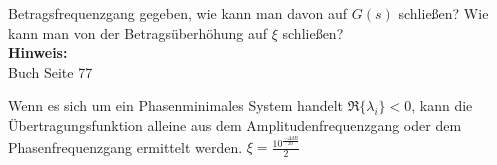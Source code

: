 \begin{question}[section=2,name={Betragsfrequenzgang},difficulty=4,type=mdl,tags={}]
	Betragsfrequenzgang gegeben, wie kann man davon auf $G(s)$ schließen? Wie	kann man von der Betragsüberhöhung auf $\xi$ schließen?
	\\ \textbf{Hinweis:}\\
	Buch Seite 77
\end{question}
\begin{solution}
	Wenn es sich um ein Phasenminimales System handelt $\Re \{\lambda_i\} < 0$, kann die Übertragungsfunktion alleine aus dem Amplitudenfrequenzgang oder dem Phasenfrequenzgang ermittelt werden.
	$\xi = \frac{10^{\frac{-\Delta dB}{20}}}{2}$
\end{solution}